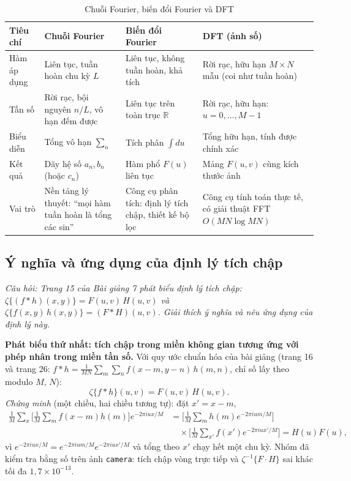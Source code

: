 \begin{table}[ht]
\centering
\scriptsize
\caption{Chuỗi Fourier, biến đổi Fourier và DFT}
\label{tab:w7_series_transform}
\renewcommand{\arraystretch}{1.3}
\begin{tabularx}{\textwidth}{|p{2.2cm}|X|X|X|}
\hline
\textbf{Tiêu chí} & \textbf{Chuỗi Fourier} & \textbf{Biến đổi Fourier} & \textbf{DFT (ảnh số)} \\
\hline
Hàm áp dụng & Liên tục, tuần hoàn chu kỳ $L$ & Liên tục, không tuần hoàn, khả tích & Rời rạc, hữu hạn $M \times N$ mẫu (coi như tuần hoàn) \\
\hline
Tần số & Rời rạc, bội nguyên $n/L$, vô hạn đếm được & Liên tục trên toàn trục $\mathbb{R}$ & Rời rạc, hữu hạn: $u = 0, \ldots, M - 1$ \\
\hline
Biểu diễn & Tổng vô hạn $\sum_n$ & Tích phân $\int du$ & Tổng hữu hạn, tính được chính xác \\
\hline
Kết quả & Dãy hệ số $a_n, b_n$ (hoặc $c_n$) & Hàm phổ $F(u)$ liên tục & Mảng $F(u, v)$ cùng kích thước ảnh \\
\hline
Vai trò & Nền tảng lý thuyết: ``mọi hàm tuần hoàn là tổng các sin'' & Công cụ phân tích: định lý tích chập, thiết kế bộ lọc & Công cụ tính toán thực tế, có giải thuật FFT $O(MN\log MN)$ \\
\hline
\end{tabularx}
\end{table}

\subsection{Ý nghĩa và ứng dụng của định lý tích chập}
\label{subsec:w7_conv_theorem}

\textit{Câu hỏi: Trang 15 của Bài giảng 7 phát biểu định lý tích chập: $\zeta\{(f * h)(x, y)\} = F(u, v)\,H(u, v)$ và $\zeta\{f(x, y)\,h(x, y)\} = (F * H)(u, v)$. Giải thích ý nghĩa và nêu ứng dụng của định lý này.}

\textbf{Phát biểu thứ nhất: tích chập trong miền không gian tương ứng với phép nhân trong miền tần số.} Với quy ước chuẩn hóa của bài giảng (trang 16 và trang 26: $f * h = \frac{1}{MN}\sum_{m}\sum_{n} f(x - m, y - n)\,h(m, n)$, chỉ số lấy theo modulo $M$, $N$):
\begin{equation}
\zeta\{f * h\}(u, v) = F(u, v)\,H(u, v).
\end{equation}
\emph{Chứng minh} (một chiều, hai chiều tương tự): đặt $x' = x - m$,
\begin{align*}
\frac{1}{M}\sum_{x}\Big[\frac{1}{M}\sum_{m} f(x - m)h(m)\Big]e^{-2\pi i u x/M}
&= \Big[\frac{1}{M}\sum_{m} h(m)e^{-2\pi i u m/M}\Big]\\
&\quad \times \Big[\frac{1}{M}\sum_{x'} f(x')e^{-2\pi i u x'/M}\Big] = H(u)F(u),
\end{align*}
vì $e^{-2\pi i u x/M} = e^{-2\pi i u m/M}e^{-2\pi i u x'/M}$ và tổng theo $x'$ chạy hết một chu kỳ. Nhóm đã kiểm tra bằng số trên ảnh \texttt{camera}: tích chập vòng trực tiếp và $\zeta^{-1}\{F \cdot H\}$ sai khác tối đa $1{,}7 \times 10^{-13}$.

